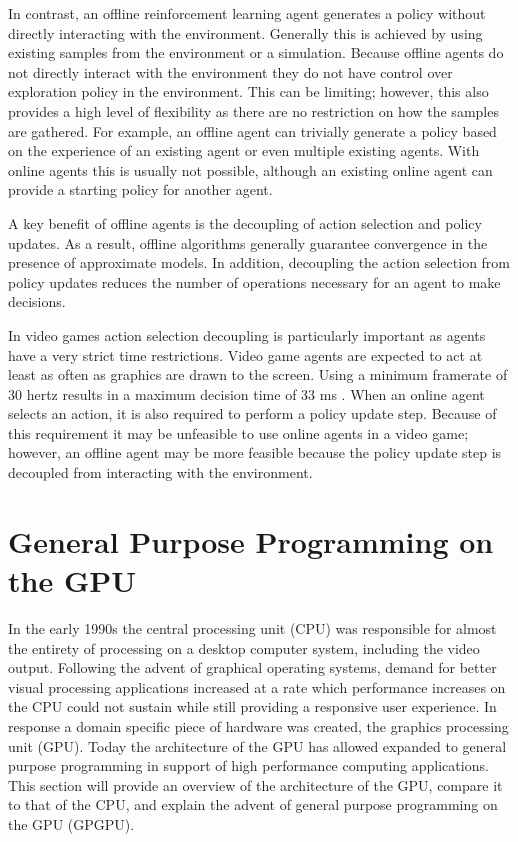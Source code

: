 In contrast, an offline reinforcement learning agent generates a policy without directly interacting with the environment. Generally this is achieved by using existing samples from the environment or a simulation. Because offline agents do not directly interact with the environment they do not have control over exploration policy in the environment. This can be limiting; however, this also provides a high level of flexibility as there are no restriction on how the samples are gathered. For example, an offline agent can trivially generate a policy based on the experience of an existing agent or even multiple existing agents. With online agents this is usually not possible, although an existing online agent can provide a starting policy for another agent.

A key benefit of offline agents is the decoupling of action selection and policy updates. As a result, offline algorithms generally guarantee convergence in the presence of approximate models. In addition, decoupling the action selection from policy updates reduces the number of operations necessary for an agent to make decisions. 

In video games action selection decoupling is particularly important as agents have a very strict time restrictions. Video game agents are expected to act at least as often as graphics are drawn to the screen. Using a minimum framerate of 30 hertz results in a maximum decision time of 33 ms \cite{game:ai:lecture}. When an online agent selects an action, it is also required to perform a policy update step. Because of this requirement it may be unfeasible to use online agents in a video game; however, an offline agent may be more feasible because the policy update step is decoupled from interacting with the environment.

\section{General Purpose Programming on the GPU}

In the early 1990s the central processing unit (CPU) was responsible for almost the entirety of processing on a desktop computer system, including the video output. Following the advent of graphical operating systems, demand for better visual processing applications increased at a rate which performance increases on the CPU could not sustain while still providing a responsive user experience. In response a domain specific piece of hardware was created, the graphics processing unit (GPU). Today the architecture of the GPU has allowed expanded to general purpose programming in support of high performance computing applications. This section will provide an overview of the architecture of the GPU, compare it to that of the CPU, and explain the advent of general purpose programming on the GPU (GPGPU).


